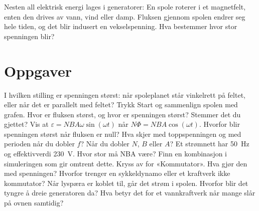\documentclass[11pt]{article}
\begin{document}

Nesten all elektrisk energi lages i generatorer: En spole roterer i et magnetfelt, enten den drives av vann, vind eller damp. Fluksen gjennom spolen endrer seg hele tiden, og det blir indusert en vekselspenning. Hva bestemmer hvor stor spenningen blir?

\section*{Oppgaver}

\begin{oppgaveliste}
\oppgave {}I hvilken stilling er spenningen størst: når spoleplanet står vinkelrett på feltet, eller når det er parallelt med feltet?
\svar
\oppgave {}Trykk Start og sammenlign spolen med grafen. Hvor er fluksen størst, og hvor er spenningen størst? Stemmer det du gjettet?
\svar
\oppgave {}Vis at $ε = NBAω \sin (ωt)$ når $NΦ = NBA \cos (ωt)$. Hvorfor blir spenningen størst når fluksen er null?
\svar
\oppgave {}Hva skjer med toppspenningen og med perioden når du dobler $f$? Når du dobler $N$, $B$ eller $A$?
\svar
\oppgave {}Et strømnett har 50~Hz og effektivverdi 230~V. Hvor stor må NBA være? Finn en kombinasjon i simuleringen som gir omtrent dette.
\svar
\oppgave {}Kryss av for «Kommutator». Hva gjør den med spenningen? Hvorfor trenger en sykkeldynamo eller et kraftverk ikke kommutator?
\svar
\oppgave {}Når lyspæra er koblet til, går det strøm i spolen. Hvorfor blir det tyngre å dreie generatoren da? Hva betyr det for et vannkraftverk når mange slår på ovnen samtidig?
\svar
\end{oppgaveliste}
\end{document}
